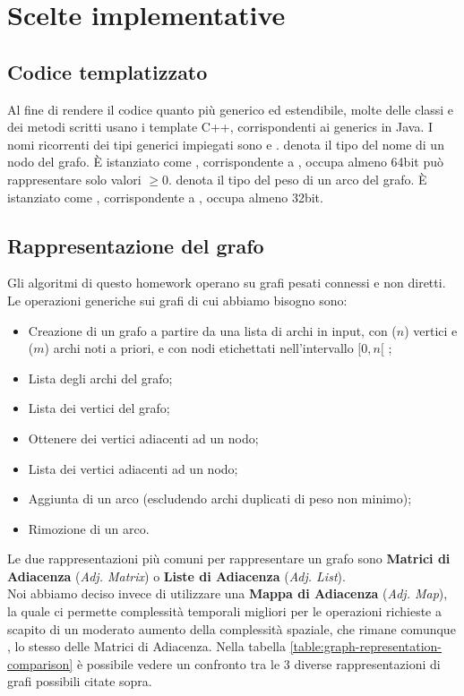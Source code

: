 \section{Scelte implementative}
\label{cap:implementation-choices}

\subsection{Codice templatizzato}

Al fine di rendere il codice quanto più generico ed estendibile, molte delle classi e dei metodi scritti
usano i template C++, corrispondenti ai generics in Java.
I nomi ricorrenti dei tipi generici impiegati sono  e .
 denota il tipo del nome di un nodo del grafo. È istanziato come , corrispondente a , occupa almeno 64bit può rappresentare solo valori $\geq 0$.
 denota il tipo del peso di un arco del grafo. È istanziato come , corrispondente a ,
occupa almeno 32bit.

\subsection{Rappresentazione del grafo}
\label{sub:graph-representation}

Gli algoritmi di questo homework operano su grafi pesati connessi e non diretti.
Le operazioni generiche sui grafi di cui abbiamo bisogno sono:

\begin{itemize}
    \item Creazione di un grafo a partire da una lista di archi in input, con ($n$) vertici e ($m$) archi noti a priori, e con nodi etichettati nell'intervallo $ [0, n[ $ ;
    \item Lista degli archi del grafo;
    \item Lista dei vertici del grafo;
    \item Ottenere dei vertici adiacenti ad un nodo;
    \item Lista dei vertici adiacenti ad un nodo;
    \item Aggiunta di un arco (escludendo archi duplicati di peso non minimo);
    \item Rimozione di un arco.
\end{itemize}

\noindent Le due rappresentazioni più comuni per rappresentare un grafo sono \textbf{Matrici di Adiacenza} (\textit{Adj. Matrix}) o \textbf{Liste di Adiacenza} (\textit{Adj. List}). \\
Noi abbiamo deciso invece di utilizzare una \textbf{Mappa di Adiacenza} (\textit{Adj. Map}), la quale ci permette complessità temporali migliori per le operazioni richieste a scapito di un moderato aumento della complessità spaziale, che rimane comunque \complexityNPlusM{}, lo stesso delle Matrici di Adiacenza. Nella tabella \ref{table:graph-representation-comparison} è possibile vedere un confronto tra le 3 diverse rappresentazioni di grafi possibili citate sopra. \\

